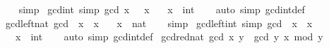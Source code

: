 \begin{isabellebody}
%
\isadelimproof
\ \ %
\endisadelimproof
%
\isatagproof
{}\isamarkupfalse%
\ simp%
\endisatagproof
{\isafoldproof}%
%
\isadelimproof
\isanewline
%
\endisadelimproof
\isanewline
{}\isamarkupfalse%
\ gcd{\isacharunderscore}{\kern0pt}{}{\isacharunderscore}{\kern0pt}int\ {\isacharbrackleft}{\kern0pt}simp{\isacharbrackright}{\kern0pt}{\isacharcolon}{\kern0pt}\ {\isachardoublequoteopen}gcd\ x\ {}\ {\isacharequal}{\kern0pt}\ {\isasymbar}x{\isasymbar}{\isachardoublequoteclose}\isanewline
\ \ \ x\ {\isacharcolon}{\kern0pt}{\isacharcolon}{\kern0pt}\ int\isanewline
%
\isadelimproof
\ \ %
\endisadelimproof
%
\isatagproof
{}\isamarkupfalse%
\ {\isacharparenleft}{\kern0pt}auto\ simp{\isacharcolon}{\kern0pt}\ gcd{\isacharunderscore}{\kern0pt}int{\isacharunderscore}{\kern0pt}def{\isacharparenright}{\kern0pt}%
\endisatagproof
{\isafoldproof}%
%
\isadelimproof
\isanewline
%
\endisadelimproof
\isanewline
{}\isamarkupfalse%
\ gcd{\isacharunderscore}{\kern0pt}{}{\isacharunderscore}{\kern0pt}left{\isacharunderscore}{\kern0pt}nat{\isacharcolon}{\kern0pt}\ {\isachardoublequoteopen}gcd\ {}\ x\ {\isacharequal}{\kern0pt}\ x{\isachardoublequoteclose}\isanewline
\ \ \ x\ {\isacharcolon}{\kern0pt}{\isacharcolon}{\kern0pt}\ nat\isanewline
%
\isadelimproof
\ \ %
\endisadelimproof
%
\isatagproof
{}\isamarkupfalse%
\ simp%
\endisatagproof
{\isafoldproof}%
%
\isadelimproof
\isanewline
%
\endisadelimproof
\isanewline
{}\isamarkupfalse%
\ gcd{\isacharunderscore}{\kern0pt}{}{\isacharunderscore}{\kern0pt}left{\isacharunderscore}{\kern0pt}int\ {\isacharbrackleft}{\kern0pt}simp{\isacharbrackright}{\kern0pt}{\isacharcolon}{\kern0pt}\ {\isachardoublequoteopen}gcd\ {}\ x\ {\isacharequal}{\kern0pt}\ {\isasymbar}x{\isasymbar}{\isachardoublequoteclose}\isanewline
\ \ \ x\ {\isacharcolon}{\kern0pt}{\isacharcolon}{\kern0pt}\ int\isanewline
%
\isadelimproof
\ \ %
\endisadelimproof
%
\isatagproof
{}\isamarkupfalse%
\ {\isacharparenleft}{\kern0pt}auto\ simp{\isacharcolon}{\kern0pt}\ gcd{\isacharunderscore}{\kern0pt}int{\isacharunderscore}{\kern0pt}def{\isacharparenright}{\kern0pt}%
\endisatagproof
{\isafoldproof}%
%
\isadelimproof
\isanewline
%
\endisadelimproof
\isanewline
{}\isamarkupfalse%
\ gcd{\isacharunderscore}{\kern0pt}red{\isacharunderscore}{\kern0pt}nat{\isacharcolon}{\kern0pt}\ {\isachardoublequoteopen}gcd\ x\ y\ {\isacharequal}{\kern0pt}\ gcd\ y\ {\isacharparenleft}{\kern0pt}x\ mod\ y{\isacharparenright}{\kern0pt}{\isachardoublequoteclose}\isanewline

\end{isabellebody}
